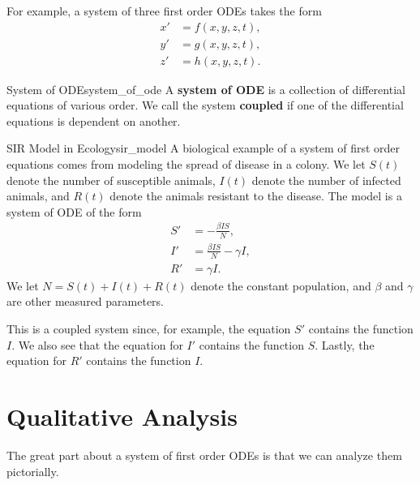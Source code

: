         For example, a system of three first order ODEs takes the form
        \begin{align*}
            x' &= f(x,y,z,t),\\
            y' &= g(x,y,z,t),\\
            z' &= h(x,y,z,t).
        \end{align*}
        
        \begin{df}{System of ODE}{system_of_ode}
            A \textbf{system of ODE} is a collection of differential equations of various order.  We call the system \textbf{coupled} if one of the differential equations is dependent on another.
        \end{df}
        
        \begin{ex}{SIR Model in Ecology}{sir_model}
        A biological example of a system of first order equations comes from modeling the spread of disease in a colony.  We let $S(t)$ denote the number of susceptible animals, $I(t)$ denote the number of infected animals, and $R(t)$ denote the animals resistant to the disease.  The model is a system of ODE of the form
        \begin{align*}
            S' &= -\frac{\beta IS}{N},\\
            I' &= \frac{\beta I S}{N} - \gamma I,\\
            R' &= \gamma I.
        \end{align*}
        We let $N=S(t)+I(t)+R(t)$ denote the constant population, and $\beta$ and $\gamma$ are other measured parameters.
        
        This is a coupled system since, for example, the equation $S'$ contains the function $I$.  We also see that the equation for $I'$ contains the function $S$.  Lastly, the equation for $R'$ contains the function $I$.  
        \end{ex}
        
 
        
        \section{Qualitative Analysis}
        The great part about a system of first order ODEs is that we can analyze them pictorially. 
        

